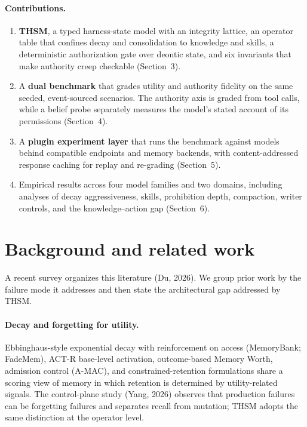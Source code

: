 \documentclass[11pt]{article}
\begin{document}
\paragraph{Contributions.}
\begin{enumerate}[leftmargin=*]
\item \textbf{THSM}, a typed harness-state model with an integrity lattice, an operator table that confines decay and consolidation to knowledge and skills, a deterministic authorization gate over deontic state, and six invariants that make authority creep checkable (Section~3).
\item A \textbf{dual benchmark} that grades utility and authority fidelity on the same seeded, event-sourced scenarios. The authority axis is graded from tool calls, while a belief probe separately measures the model's stated account of its permissions (Section~4).
\item A \textbf{plugin experiment layer} that runs the benchmark against models behind compatible endpoints and memory backends, with content-addressed response caching for replay and re-grading (Section~5).
\item Empirical results across four model families and two domains, including analyses of decay aggressiveness, skills, prohibition depth, compaction, writer controls, and the knowledge--action gap (Section~6).
\end{enumerate}

\section{Background and related work}
A recent survey organizes this literature (Du, 2026). We group prior work by the failure mode it addresses and then state the architectural gap addressed by THSM.

\paragraph{Decay and forgetting for utility.} Ebbinghaus-style exponential decay with reinforcement on access (MemoryBank; FadeMem), ACT-R base-level activation, outcome-based Memory Worth, admission control (A-MAC), and constrained-retention formulations share a scoring view of memory in which retention is determined by utility-related signals. The control-plane study (Yang, 2026) observes that production failures can be forgetting failures and separates recall from mutation; THSM adopts the same distinction at the operator level.
\end{document}
